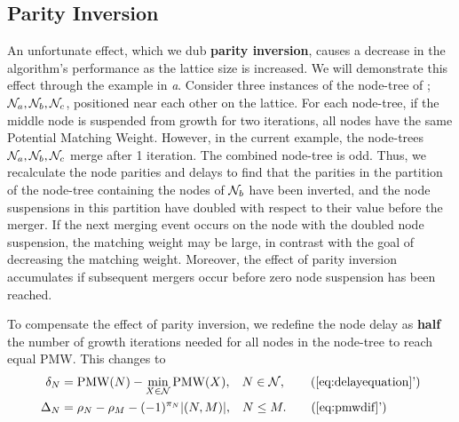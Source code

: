 \subsection{Parity Inversion}\label{sec:inversion}
An unfortunate effect, which we dub \textbf{parity inversion}, causes a decrease in the algorithm's performance as the lattice size is increased. We will demonstrate this effect through the example in \emph{a}. Consider three instances of the node-tree of ; $\mathcal{N}_a, \mathcal{N}_b, \mathcal{N}_c$, positioned near each other on the lattice. For each node-tree, if the middle node is suspended from growth for two iterations, all nodes have the same Potential Matching Weight. However, in the current example, the node-trees $\mathcal{N}_a, \mathcal{N}_b, \mathcal{N}_c$ merge after 1 iteration. The combined node-tree is odd. Thus, we recalculate the node parities and delays to find that the parities in the partition of the node-tree containing the nodes of $\mathcal{N}_b$ have been inverted, and the node suspensions in this partition have doubled with respect to their value before the merger. If the next merging event occurs on the node with the doubled node suspension, the matching weight may be large, in contrast with the goal of decreasing the matching weight. Moreover, the effect of parity inversion accumulates if subsequent mergers occur before zero node suspension has been reached. %

To compensate the effect of parity inversion, we redefine the node delay as \textbf{half} the number of growth iterations needed for all nodes in the node-tree to reach equal PMW. This changes  to 
\begin{align}
    \delta_N &= \text{PMW}(N) - \min_{X\in\nset}{\text{PMW}(X)}, \hspace{.3cm} N \in \nset, \tag{\ref{eq:delayequation}'}  \\
    \Delta_N &= \rho_N-\rho_M - (-1)^{\pi_N}\abs{(N,M)}, \hspace{.3cm} N\leq M. \tag{\ref{eq:pmwdif}'}\label{eq:pmwdifnew}
\end{align}


